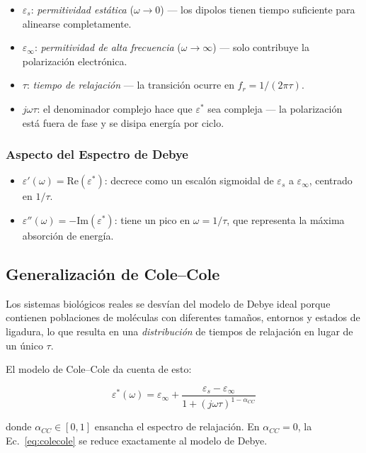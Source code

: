 \documentclass[12pt]{article}
\begin{document}
\begin{itemize}
\item $\varepsilon_s$: \emph{permitividad est\'atica} ($\omega \to 0$) --- los dipolos
tienen tiempo suficiente para alinearse completamente.
\item $\varepsilon_\infty$: \emph{permitividad de alta frecuencia} ($\omega \to \infty$)
--- solo contribuye la polarizaci\'on electr\'onica.
\item $\tau$: \emph{tiempo de relajaci\'on} --- la transici\'on ocurre en
$f_r = 1/(2\pi\tau)$.
\item $j\omega\tau$: el denominador complejo hace que $\varepsilon^*$ sea compleja
--- la polarizaci\'on est\'a fuera de fase y se disipa energ\'ia por ciclo.
\end{itemize}

\subsubsection{Aspecto del Espectro de Debye}

\begin{itemize}
\item $\varepsilon'(\omega) = \text{Re}(\varepsilon^*)$: decrece como un escal\'on
sigmoidal de $\varepsilon_s$ a $\varepsilon_\infty$, centrado en $1/\tau$.
\item $\varepsilon''(\omega) = -\text{Im}(\varepsilon^*)$: tiene un pico en $\omega =
1/\tau$, que representa la m\'axima absorci\'on de energ\'ia.
\end{itemize}
\subsection{Generalizaci\'on de Cole--Cole}

Los sistemas biol\'ogicos reales se desvían del modelo de Debye ideal porque contienen
poblaciones de mol\'eculas con diferentes tama\~{n}os, entornos y estados de ligadura, lo que
resulta en una \emph{distribuci\'on} de tiempos de relajaci\'on en lugar de un \'unico $\tau$.

El modelo de Cole--Cole da cuenta de esto:

\begin{equation}
\boxed{
\varepsilon^*(\omega) =
\varepsilon_\infty +
\frac{\varepsilon_s - \varepsilon_\infty}{1 + (j\omega\tau)^{1-\alpha_{CC}}}
}
\label{eq:colecole}
\end{equation}

donde $\alpha_{CC} \in [0,1]$ ensancha el espectro de relajaci\'on. En $\alpha_{CC} = 0$, la
Ec.~\eqref{eq:colecole} se reduce exactamente al modelo de Debye.
\end{document}
